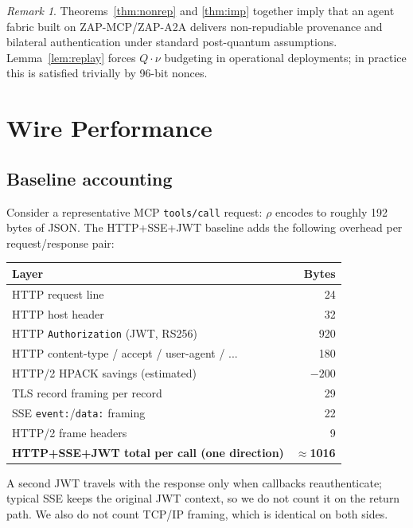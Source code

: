 \documentclass[11pt,a4paper]{article}
\theoremstyle{definition}
\theoremstyle{remark}
\newtheorem{remark}[theorem]{Remark}
\newcommand{\zapmcp}{\textsf{ZAP-MCP}\xspace}
\newcommand{\zapaa}{\textsf{ZAP-A2A}\xspace}
\newcommand{\mcp}{\textsf{MCP}\xspace}
\begin{document}
\begin{remark}
Theorems~\ref{thm:nonrep} and \ref{thm:imp} together imply that an
agent fabric built on \zapmcp{}/\zapaa{} delivers non-repudiable
provenance and bilateral authentication under standard post-quantum
assumptions. Lemma~\ref{lem:replay} forces $Q \cdot \nu$
budgeting in operational deployments; in practice this is satisfied
trivially by 96-bit nonces.
\end{remark}

\section{Wire Performance}\label{sec:perf}

\subsection{Baseline accounting}

Consider a representative \mcp{} \texttt{tools/call} request:
$\rho$ encodes to roughly 192 bytes of JSON. The HTTP+SSE+JWT baseline
adds the following overhead per request/response pair:

\begin{table}[h]
\centering
\small
\begin{tabular}{lr}
\toprule
\textbf{Layer} & \textbf{Bytes} \\
\midrule
HTTP request line                              & 24 \\
HTTP host header                               & 32 \\
HTTP \texttt{Authorization} (JWT, RS256)       & 920 \\
HTTP content-type / accept / user-agent / ...  & 180 \\
HTTP/2 HPACK savings (estimated)               & $-200$ \\
TLS record framing per record                  & 29 \\
SSE \texttt{event:}/\texttt{data:} framing    & 22 \\
HTTP/2 frame headers                           & 9 \\
\midrule
\textbf{HTTP+SSE+JWT total per call (one direction)} & \textbf{$\approx$1016} \\
\bottomrule
\end{tabular}
\end{table}

A second JWT travels with the response only when callbacks reauthenticate;
typical SSE keeps the original JWT context, so we do not count it on the
return path. We also do not count TCP/IP framing, which is identical on
both sides.
\end{document}

